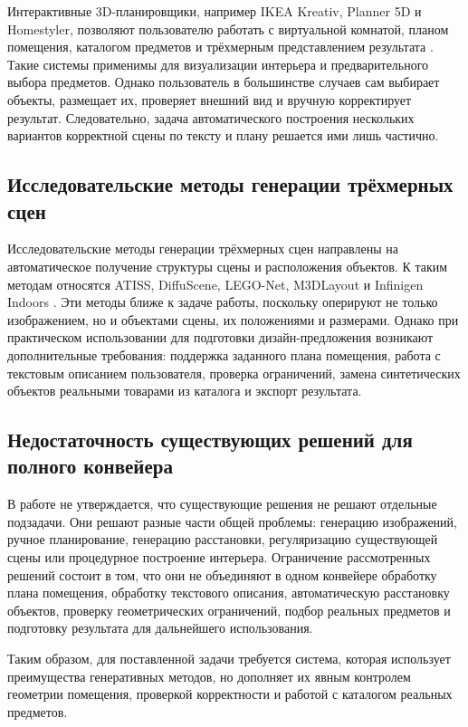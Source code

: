 \documentclass[times]{itmo-student-thesis}
\begin{document}
Интерактивные 3D-планировщики, например IKEA Kreativ, Planner 5D и Homestyler, позволяют пользователю работать с виртуальной комнатой, планом помещения, каталогом предметов и трёхмерным представлением результата \cite{ikeaKreativ,planner5d,homestyler}. Такие системы применимы для визуализации интерьера и предварительного выбора предметов. Однако пользователь в большинстве случаев сам выбирает объекты, размещает их, проверяет внешний вид и вручную корректирует результат. Следовательно, задача автоматического построения нескольких вариантов корректной сцены по тексту и плану решается ими лишь частично.

\subsection{Исследовательские методы генерации трёхмерных сцен}

Исследовательские методы генерации трёхмерных сцен направлены на автоматическое получение структуры сцены и расположения объектов. К таким методам относятся ATISS, DiffuScene, LEGO-Net, M3DLayout и Infinigen Indoors \cite{paschalidou2021atiss,tang2024diffuscene,wei2023legonet,zhang2025m3dlayout,infinigen2024indoors}. Эти методы ближе к задаче работы, поскольку оперируют не только изображением, но и объектами сцены, их положениями и размерами. Однако при практическом использовании для подготовки дизайн-предложения возникают дополнительные требования: поддержка заданного плана помещения, работа с текстовым описанием пользователя, проверка ограничений, замена синтетических объектов реальными товарами из каталога и экспорт результата.

\subsection{Недостаточность существующих решений для полного конвейера}

В работе не утверждается, что существующие решения не решают отдельные подзадачи. Они решают разные части общей проблемы: генерацию изображений, ручное планирование, генерацию расстановки, регуляризацию существующей сцены или процедурное построение интерьера. Ограничение рассмотренных решений состоит в том, что они не объединяют в одном конвейере обработку плана помещения, обработку текстового описания, автоматическую расстановку объектов, проверку геометрических ограничений, подбор реальных предметов и подготовку результата для дальнейшего использования.

Таким образом, для поставленной задачи требуется система, которая использует преимущества генеративных методов, но дополняет их явным контролем геометрии помещения, проверкой корректности и работой с каталогом реальных предметов.
\end{document}
